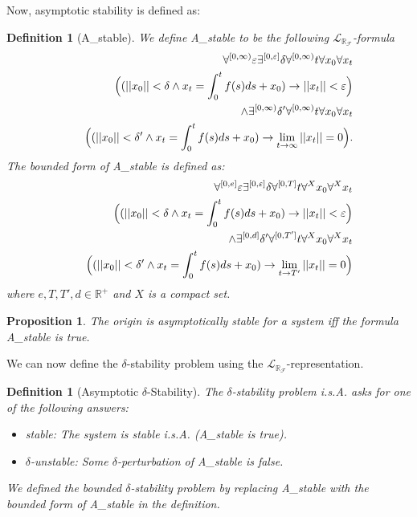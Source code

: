 \documentclass[10pt]{article}
\theoremstyle{plain}
\newtheorem{proposition}[theorem]{Proposition}
\newtheorem{definition}[theorem]{Definition}
\theoremstyle{definition}
\newcommand{\lrf}{\mathcal{L}_{\mathbb{R}_{\mathcal{F}}}}
\begin{document}
Now, asymptotic stability is defined as:
\begin{definition}[{\sf A\_stable}]
We define {\sf A\_stable} to be the following $\lrf$-formula
\begin{eqnarray*}
& &\forall^{[0,\infty)} \varepsilon\exists^{[0,\varepsilon]} \delta\forall^{[0,\infty)} t\forall x_0\forall x_t\\
& &\hspace{.5cm}\Big((||x_0||<\delta \wedge x_t = \int_0^t f(s)ds + x_0 )\rightarrow ||x_t||<\varepsilon\Big)\\
& &\wedge \exists^{[0,\infty)} \delta'  \forall^{[0,\infty)} t\forall x_0\forall x_t\\
& & \hspace{.3cm}\Big( (||x_0||<\delta'\wedge x_t = \int_0^t f(s)ds + x_0 )\rightarrow \lim_{t\rightarrow \infty} ||x_t|| = 0\Big). 
\end{eqnarray*}
The bounded form of {\sf A\_stable} is defined as:
\begin{eqnarray*}
& &\forall^{[0,e]} \varepsilon\exists^{[0,\varepsilon]} \delta\forall^{[0,T]} t\forall^X x_0\forall^X x_t\\
& &\hspace{.5cm}\Big((||x_0||<\delta \wedge x_t = \int_0^t f(s)ds + x_0 )\rightarrow ||x_t||<\varepsilon\Big)\\
& &\wedge \exists^{[0,d]} \delta'  \forall^{[0,T']} t\forall^X x_0\forall^X x_t\\
& & \hspace{.3cm}\Big( (||x_0||<\delta'\wedge x_t = \int_0^t f(s)ds + x_0 )\rightarrow \lim_{t\rightarrow T'} ||x_t|| = 0\Big) 
\end{eqnarray*}
where $e,T,T',d\in \mathbb{R}^+$ and $X$ is a compact set. 
\end{definition}
\begin{proposition}
The origin is asymptotically stable for a system iff the formula {\sf A\_stable} is true. 
\end{proposition}
We can now define the $\delta$-stability problem using the $\lrf$-representation.  
\begin{definition}[Asymptotic $\delta$-Stability]\label{sl}
The $\delta$-stability problem i.s.A. asks for one of the following answers:
\begin{itemize}
\item {\sf stable}: The system is stable i.s.A. ({\sf A\_stable} is true). 
\item {\sf $\delta$-unstable}: Some $\delta$-perturbation of {\sf A\_stable} is false. 
\end{itemize}
We defined the {\em bounded} $\delta$-stability problem by replacing {\sf A\_stable} with the bounded form of {\sf A\_stable} in the definition. 
\end{definition}
\end{document}
